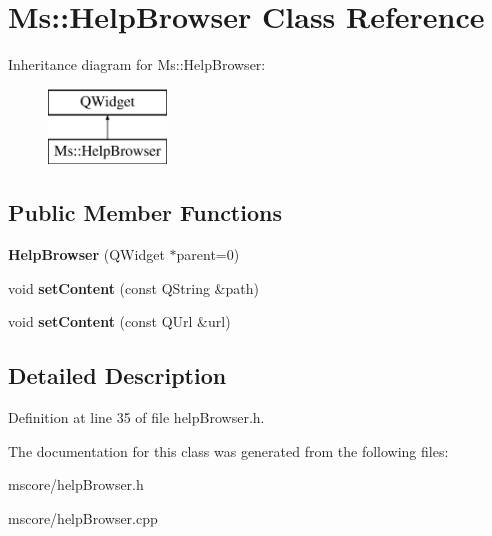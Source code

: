 \hypertarget{class_ms_1_1_help_browser}{}\section{Ms\+:\+:Help\+Browser Class Reference}
\label{class_ms_1_1_help_browser}
Inheritance diagram for Ms\+:\+:Help\+Browser\+:\begin{figure}[H]
\begin{center}
\leavevmode
\includegraphics[height=2.000000cm]{class_ms_1_1_help_browser}
\end{center}
\end{figure}
\subsection*{Public Member Functions}
\begin{DoxyCompactItemize}
\item 
\mbox{\label{class_ms_1_1_help_browser_a0a150d2392739302cd7cd2ea1b9e75dd}} 
{\bfseries Help\+Browser} (Q\+Widget $\ast$parent=0)
\item 
\mbox{\label{class_ms_1_1_help_browser_acd34e7a8fc4acb5a9df11d456505cf91}} 
void {\bfseries set\+Content} (const Q\+String \&path)
\item 
\mbox{\label{class_ms_1_1_help_browser_a70a08e44b957d5abe84da5482cc6d193}} 
void {\bfseries set\+Content} (const Q\+Url \&url)
\end{DoxyCompactItemize}


\subsection{Detailed Description}


Definition at line 35 of file help\+Browser.\+h.



The documentation for this class was generated from the following files\+:\begin{DoxyCompactItemize}
\item 
mscore/help\+Browser.\+h\item 
mscore/help\+Browser.\+cpp\end{DoxyCompactItemize}
